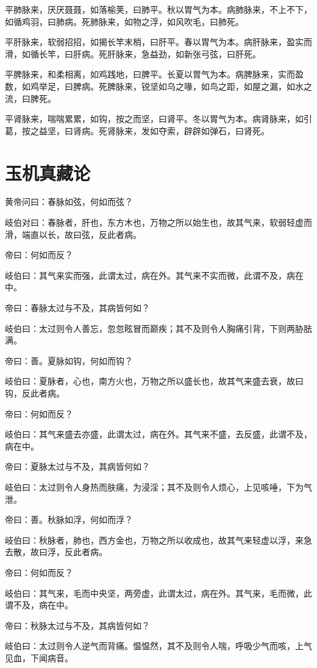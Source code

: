\documentclass{article}%
\begin{document}
平肺脉来，厌厌聂聂，如落榆荚，曰肺平。秋以胃气为本。病肺脉来，不上不下，如循鸡羽，曰肺病。死肺脉来，如物之浮，如风吹毛，曰肺死。

平肝脉来，软弱招招，如揭长竿末梢，曰肝平。春以胃气为本。病肝脉来，盈实而滑，如循长竿，曰肝病。死肝脉来，急益劲，如新张弓弦，曰肝死。

平脾脉来，和柔相离，如鸡践地，曰脾平。长夏以胃气为本。病脾脉来，实而盈数，如鸡举足，曰脾病。死脾脉来，锐坚如乌之喙，如鸟之距，如屋之漏，如水之流，曰脾死。

平肾脉来，喘喘累累，如钩，按之而坚，曰肾平。冬以胃气为本。病肾脉来，如引葛，按之益坚，曰肾病。死肾脉来，发如夺索，辟辟如弹石，曰肾死。
\section{玉机真藏论}
黄帝问曰：春脉如弦，何如而弦？

岐伯对曰：春脉者，肝也，东方木也，万物之所以始生也，故其气来，软弱轻虚而滑，端直以长，故曰弦，反此者病。

帝曰：何如而反？

岐伯曰：其气来实而强，此谓太过，病在外。其气来不实而微，此谓不及，病在中。

帝曰：春脉太过与不及，其病皆何如？

岐伯曰：太过则令人善忘，忽忽眩冒而巅疾；其不及则令人胸痛引背，下则两胁胠满。

帝曰：善。夏脉如钩，何如而钩？

岐伯曰：夏脉者，心也，南方火也，万物之所以盛长也，故其气来盛去衰，故曰钩，反此者病。

帝曰：何如而反？

岐伯曰：其气来盛去亦盛，此谓太过，病在外。其气来不盛，去反盛，此谓不及，病在中。

帝曰：夏脉太过与不及，其病皆何如？

岐伯曰：太过则令人身热而肤痛，为浸淫；其不及则令人烦心，上见咳唾，下为气泄。

帝曰：善。秋脉如浮，何如而浮？

岐伯曰：秋脉者，肺也，西方金也，万物之所以收成也，故其气来轻虚以浮，来急去散，故曰浮，反此者病。

帝曰：何如而反？

岐伯曰：其气来，毛而中央坚，两旁虚，此谓太过，病在外。其气来，毛而微，此谓不及，病在中。

帝曰：秋脉太过与不及，其病皆何如？

岐伯曰：太过则令人逆气而背痛。愠愠然，其不及则令人喘，呼吸少气而咳，上气见血，下闻病音。
\end{document}

